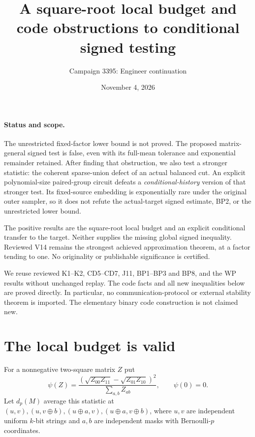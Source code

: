 \documentclass[11pt]{article}
\title{A square-root local budget and code obstructions to conditional signed testing}
\author{Campaign 3395: Engineer continuation}
\date{November 4, 2026}
\begin{document}
\maketitle

\paragraph{Status and scope.}
The unrestricted fixed-factor lower bound is not proved.
The proposed matrix-general signed test is false, even with its
full-mean tolerance and exponential remainder retained.
After finding that obstruction, we also test a stronger statistic:
the coherent sparse-union defect of an actual balanced cut.
An explicit polynomial-size paired-group circuit defeats a
\emph{conditional-history} version of that stronger test.
Its fixed-source embedding is exponentially rare under the original
outer sampler, so it does not refute the actual-target signed estimate,
BP2, or the unrestricted lower bound.

The positive results are the square-root local budget and an explicit
conditional transfer to the target. Neither supplies the missing
global signed inequality. Reviewed V14 remains the strongest achieved
approximation theorem, at a factor tending to one.
No originality or publishable significance is certified.

We reuse reviewed K1--K2, CD5--CD7, J11, BP1--BP3 and BP8,
and the WP results without unchanged replay.
The code facts and all new inequalities below are proved directly.
In particular, no communication-protocol or external stability theorem
is imported. The elementary binary code construction is not claimed new.

\section{The local budget is valid}
For a nonnegative two-square matrix $Z$ put
\[
 \psi(Z)=
 \frac{(\sqrt{Z_{00}Z_{11}}-\sqrt{Z_{01}Z_{10}})^2}
      {\sum_{a,b}Z_{ab}},\qquad \psi(0)=0.                 \tag{ST1}
\]
Let $d_p(M)$ average this statistic at
$(u,v),(u,v\oplus b),(u\oplus a,v),(u\oplus a,v\oplus b)$,
where $u,v$ are independent uniform $k$-bit strings and $a,b$
are independent masks with Bernoulli-$p$ coordinates.
\end{document}
